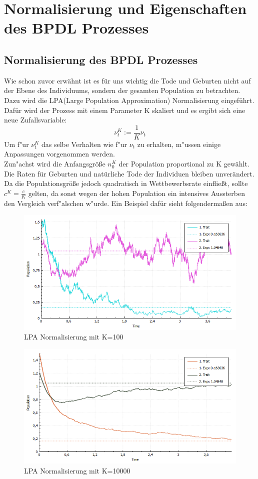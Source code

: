 \documentclass[11pt, a4paper, german]{article}
\begin{document}
\clearpage
\section{Normalisierung und Eigenschaften des BPDL Prozesses}

\subsection{Normalisierung des BPDL Prozesses}
	Wie schon zuvor erwähnt ist es für uns wichtig die Tode und Geburten nicht auf der Ebene des Individuums, sondern der gesamten Population zu betrachten. Dazu wird die LPA(Large Population Approximation) Normalisierung eingeführt.\\
	Dafür wird der Prozess mit einem Parameter K skaliert und es ergibt sich eine neue Zufallsvariable:
	\[ \nu_t^K := \frac{1}{K} \nu_t \]
	Um f"ur $ \nu_t^K $ das selbe Verhalten wie f"ur $ \nu_t $ zu erhalten, m"ussen einige Anpassungen vorgenommen werden.\\
	Zun"achst wird die Anfangsgröße $ n_0^K $ der Population proportional zu K gewählt.
	Die Raten für Geburten und natürliche Tode der Individuen bleiben unverändert. Da die Populationsgröße jedoch quadratisch in Wettbewerbsrate einfließt, sollte $ c^K = \frac{c}{K} $ gelten, da sonst wegen der hohen Population ein intensives Aussterben den Vergleich verf"alschen w"urde. Ein Beispiel dafür sieht folgendermaßen aus:
	\begin{figure}[H]
		\centering
		\includegraphics[width=0.7\linewidth]{./Pictures/LPANormalisierungK100}
		\caption[LPAK100]{LPA Normalisierung mit K=100}
		\label{LPA Normalisierung K=100}
	\end{figure}
	\begin{figure}[H]
		\centering
		\includegraphics[width=0.7\linewidth]{./Pictures/LPANormalisierungK10000}
		\caption[LPAK100]{LPA Normalisierung mit K=10000}
		\label{LPA Normalisierung K=10000}
	\end{figure}
	
\end{document}
